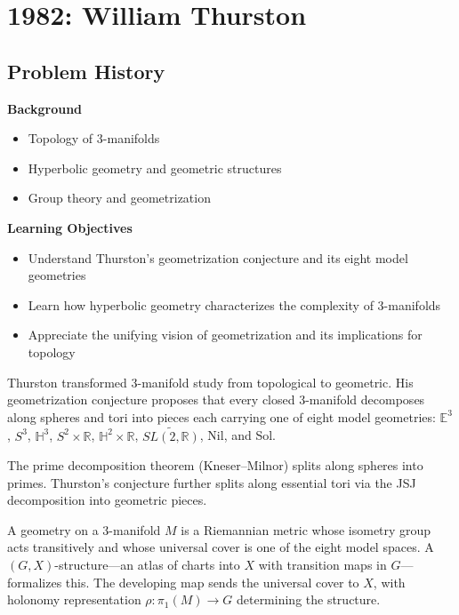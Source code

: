 \chapter{1982: William Thurston}

\section*{Problem History}

\begin{prereqs}
\noindent \textbf{Background}
\begin{itemize}
\item Topology of 3-manifolds
\item Hyperbolic geometry and geometric structures
\item Group theory and geometrization
\end{itemize}
\end{prereqs}

\begin{objectives}
\noindent \textbf{Learning Objectives}
\begin{itemize}
\item Understand Thurston's geometrization conjecture and its eight model geometries
\item Learn how hyperbolic geometry characterizes the complexity of 3-manifolds
\item Appreciate the unifying vision of geometrization and its implications for topology
\end{itemize}
\end{objectives}

Thurston transformed 3-manifold study from topological to geometric. His
geometrization conjecture proposes that every closed 3-manifold decomposes
along spheres and tori into pieces each carrying one of eight model
geometries: $\mathbb{E}^3$, $S^3$, $\mathbb{H}^3$, $S^2 \times \mathbb{R}$,
$\mathbb{H}^2 \times \mathbb{R}$, $\widetilde{SL(2,\mathbb{R})}$, Nil,
and Sol.

The prime decomposition theorem (Kneser--Milnor) splits along spheres
into primes. Thurston's conjecture further splits along essential tori
via the JSJ decomposition into geometric pieces.

A geometry on a 3-manifold $M$ is a Riemannian metric whose isometry
group acts transitively and whose universal cover is one of the eight
model spaces. A $(G, X)$-structure---an atlas of charts into $X$ with
transition maps in $G$---formalizes this. The developing map sends the
universal cover to $X$, with holonomy representation
$\rho: \pi_1(M) \to G$ determining the structure.

